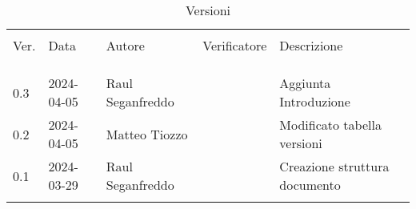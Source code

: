 \documentclass[italian,12pt]{article} %
\begin{document}


\newpage



\begin{table}[!h]
	\caption*{Versioni}
	\begin{center}
		\begin{tabular}{ l l l l l}
			\hline\\[-2ex]
			Ver. & Data       & Autore           & Verificatore   & Descrizione\\
			\\[-2ex] \hline \\[-1.5ex] \\
			0.3  & 2024-04-05 & Raul Seganfreddo &  & Aggiunta Introduzione		 \\
			0.2  & 2024-04-05 & Matteo Tiozzo    &  & Modificato tabella versioni\\
			0.1  & 2024-03-29 & Raul Seganfreddo &  & Creazione struttura documento\\
			\\[-1.5ex] \hline
		\end{tabular}
	\end{center}
\end{table}

\newpage

\tableofcontents

\listoftables

\listoffigures

\newpage



\newpage



\newpage



\newpage



\newpage




\newpage




\newpage
\end{document}
